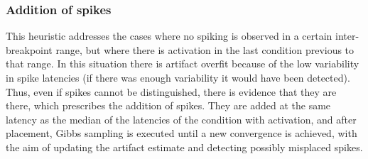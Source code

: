 \documentclass[12pt,letterpaper,fleqn]{article}
\begin{document}
\subsubsection{Addition of spikes}
This heuristic addresses the cases where no spiking is observed in a certain inter-breakpoint range, but where there is activation in the last condition previous to that range. In this situation there is artifact overfit because of the low variability in spike latencies (if there was enough variability it would have been detected). Thus, even if spikes cannot be distinguished, there is evidence that they are there, which prescribes the addition of spikes. They are added at the same latency as the median of the latencies of the condition with activation, and after placement, Gibbs sampling is executed until a new convergence is achieved, with the aim of updating the artifact estimate and detecting possibly misplaced spikes.


  



    
\end{document}
